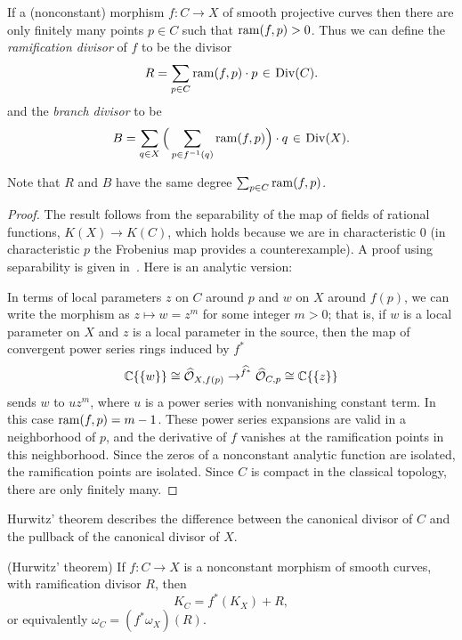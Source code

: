 \begin{proposition}
If a (nonconstant) morphism $f : C \to X$ of smooth projective curves then there are only finitely many
points $p\in C$ such that $\operatorname{ram}(f,p)>0$.
Thus we can define the \emph{ramification divisor} of $f$ to be the divisor
 $$
 R = \sum_{p \in C} \ram(f,p)\cdot p \; \in \;  \Div(C).
 $$
 and the \emph{branch divisor} to be
 $$
 B = \sum_{q \in X} \Big(\sum_{p \in f^{-1}(q)} \ram(f,p) \Big)\cdot q \; \in \; \Div(X).
 $$
\end{proposition}

Note that $R$ and $B$ have the same degree $\sum_{p \in C} \operatorname{ram}(f,p)$.

\begin{proof}
The result follows from the separability of the map of fields of rational functions, $K(X) \to K(C)$, which holds because we
are in characteristic 0 (in characteristic $p$ the Frobenius map provides a counterexample). A proof using separability
is given in~\cite[Section IV.2]{Hartshorne1977}. Here is an analytic version:

In terms of local parameters $z$ on $C$ around $p$ and $w$ on $X$ around $f(p)$, we can write the morphism as $z \mapsto w = z^m$ for some integer $m > 0$; that is,
if $w$ is a local parameter on $X$ and $z$ is a local parameter in the source, then
the map of convergent power series rings induced by $f^*$
$$
 {\mathbb C}\{\{w\}\} \cong \widehat{{\mathcal O}}_{X,f(p)} \to^{\widehat {f^*}}\widehat{{\mathcal O}}_{C,p}\cong  {\mathbb C}\{\{z\}\} 
$$
sends $w$ to $uz^m$, where $u$ is a power series with nonvanishing constant term.
In this case $\operatorname{ram}(f,p) = m-1$. These power series expansions are valid in a neighborhood
of $p$, and the derivative of $f$ vanishes at the ramification points in this neighborhood. Since
the zeros of a nonconstant analytic function are isolated, the ramification points are isolated. 
Since $C$ is compact in the classical topology, there are only finitely many.
\end{proof}

 Hurwitz' theorem describes the difference between the canonical divisor of $C$ and the pullback of the canonical divisor of $X$.
\begin{theorem}(Hurwitz' theorem) \cite[Proposition IV.2.3]{Hartshorne1977} \label{Hurwitz}
If $f:C\to X$ is a nonconstant morphism of smooth curves, with ramification divisor $R$, then 
$$
K_C = f^{*}(K_{X})+R,$$
or equivalently
$
\omega_{C} = (f^{*}\omega_{X})(R).
$
\end{theorem}
 
